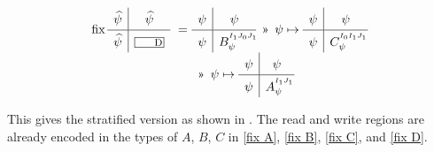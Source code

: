 \begin{equation}
  \begin{array}{@{} l @{} l @{}}
    \fix\quadrants{\lifted\psi}{\lifted\psi}{\lifted\psi}{\lbox D} ~=~ &
      \quadrants{\psi}{\psi}{\psi}{B^{^{I_1J_0J_1}}_\psi\!\!\!\!} ~\applt~
      \psi\mapsto\quadrants{\psi}{\psi}{\psi}{C^{^{I_0I_1J_1}}_\psi\!\!\!} \\
    &
       ~\applt~ \psi\mapsto\quadrants{\psi}{\psi}{\psi}{A^{^{I_1J_1}}_\psi\!\!\!}
  \end{array}
  \label{fix D}
\end{equation}

This gives the stratified version as shown in .
The read and write regions are already encoded in the types of $A$, $B$, $C$ in 
\eqref{fix A}, \eqref{fix B}, \eqref{fix C}, and \eqref{fix D}.

